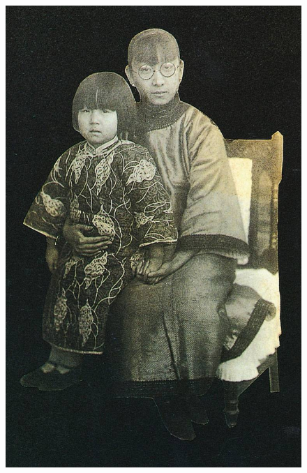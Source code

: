 \begin{figure}[htb]
    \centering %
    \includegraphics[scale=0.4]{picture/对照记4.jpeg}
\end{figure}

